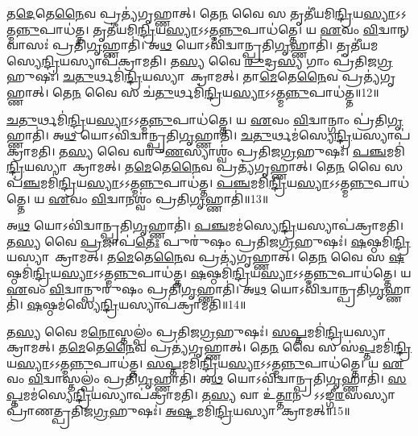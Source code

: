 𑌤\ul{𑌦𑍇}𑌤𑍇\ul{𑌨𑍈}𑌵 𑌪𑍍𑌰𑌤𑍍𑌯॑𑌗𑍃𑌹𑍍𑌣𑌾𑌤𑍍।
𑌤𑍇\ul{𑌨} 𑌵𑍈 𑌸 𑌤𑍃𑌤𑍀॑𑌯𑌮𑌿\ul{𑌨𑍍𑌦𑍍𑌰𑌿}𑌯\-\ul{𑌸𑍍𑌯𑌾}\-𑌽𑌽𑌤𑍍𑌮\ul{𑌨𑍍𑌨𑍁}𑌪𑌾\-𑌧॑𑌤𑍍𑌤।
𑌤𑍃𑌤𑍀॑𑌯𑌮𑌿\ul{𑌨𑍍𑌦𑍍𑌰𑌿}𑌯\-\ul{𑌸𑍍𑌯𑌾}\-𑌽𑌽𑌤𑍍𑌮\ul{𑌨𑍍𑌨𑍁}𑌪𑌾\-𑌧॑𑌤𑍍𑌤𑍇।
𑌯 \ul{𑌏}𑌵𑌂 \ul{𑌵𑌿}𑌦𑍍𑌵𑌾𑌨𑍍 𑌵𑌾𑌸𑌃॑ 𑌪𑍍𑌰𑌤𑌿\ul{𑌗𑍃}𑌹𑍍𑌣𑌾𑌤𑌿॑।
𑌅\ul{𑌥} 𑌯𑍋𑌽𑌵𑌿॑𑌦𑍍𑌵𑌾𑌨𑍍𑌪𑍍𑌰𑌤𑌿\-\ul{𑌗𑍃}𑌹𑍍𑌣𑌾𑌤𑌿॑।
𑌤𑍃𑌤𑍀॑𑌯𑌮𑌸𑍍𑌯𑍇\ul{𑌨𑍍𑌦𑍍𑌰𑌿}𑌯\-𑌸𑍍𑌯𑌾𑌪॑\-𑌕𑍍𑌰𑌾𑌮𑌤𑌿।
𑌤\ul{𑌸𑍍𑌯} 𑌵𑍈 \ul{𑌰𑍁}𑌦𑍍𑌰\ul{𑌸𑍍𑌯} 𑌗𑌾𑌂 𑌪𑍍𑌰॑𑌤𑌿𑌜\ul{𑌗𑍍𑌰}𑌹𑍁𑌷𑌃॑।
\ul{𑌚}\ul{𑌤𑍁}𑌰𑍍𑌥𑌮𑌿॑\ul{𑌨𑍍𑌦𑍍𑌰𑌿}𑌯\-𑌸𑍍𑌯𑌾𑌪𑌾᳚\-𑌕𑍍𑌰𑌾𑌮𑌤𑍍।
𑌤𑌾\ul{𑌮𑍇}𑌤𑍇\ul{𑌨𑍈}𑌵 𑌪𑍍𑌰𑌤𑍍𑌯॑𑌗𑍃𑌹𑍍𑌣𑌾𑌤𑍍।
𑌤𑍇\ul{𑌨} 𑌵𑍈 𑌸 𑌚॑\ul{𑌤𑍁}𑌰𑍍𑌥𑌮𑌿॑\ul{𑌨𑍍𑌦𑍍𑌰𑌿}𑌯\-\ul{𑌸𑍍𑌯𑌾}\-𑌽𑌽𑌤𑍍𑌮\ul{𑌨𑍍𑌨𑍁}𑌪𑌾\-𑌧॑𑌤𑍍𑌤॥12॥

\ul{𑌚}\ul{𑌤𑍁}𑌰𑍍𑌥𑌮𑌿॑\ul{𑌨𑍍𑌦𑍍𑌰𑌿}𑌯\-\ul{𑌸𑍍𑌯𑌾}\-𑌽𑌽𑌤𑍍𑌮\ul{𑌨𑍍𑌨𑍁}𑌪𑌾\-𑌧॑𑌤𑍍𑌤𑍇।
𑌯 \ul{𑌏}𑌵𑌂 \ul{𑌵𑌿}𑌦𑍍𑌵𑌾𑌨𑍍𑌗𑌾𑌂 𑌪𑍍𑌰॑𑌤𑌿\ul{𑌗𑍃}𑌹𑍍𑌣𑌾𑌤𑌿॑।
𑌅\ul{𑌥} 𑌯𑍋𑌽𑌵𑌿॑𑌦𑍍𑌵𑌾𑌨𑍍𑌪𑍍𑌰𑌤𑌿\ul{𑌗𑍃}𑌹𑍍𑌣𑌾𑌤𑌿॑।
\ul{𑌚}\ul{𑌤𑍁}𑌰𑍍𑌥𑌮॑𑌸𑍍𑌯𑍇\ul{𑌨𑍍𑌦𑍍𑌰𑌿}𑌯\-𑌸𑍍𑌯𑌾𑌪॑\-𑌕𑍍𑌰𑌾𑌮𑌤𑌿।
𑌤\ul{𑌸𑍍𑌯} 𑌵𑍈 𑌵𑌰𑍁॑\ul{𑌣}𑌸𑍍𑌯𑌾𑌶𑍍𑌵𑌂॑ 𑌪𑍍𑌰𑌤𑌿𑌜\ul{𑌗𑍍𑌰}𑌹𑍁𑌷𑌃॑।
\ul{𑌪}\ul{𑌞𑍍𑌚}𑌮𑌮𑌿॑\ul{𑌨𑍍𑌦𑍍𑌰𑌿}𑌯\-𑌸𑍍𑌯𑌾𑌪𑌾᳚\-𑌕𑍍𑌰𑌾𑌮𑌤𑍍।
𑌤\ul{𑌮𑍇}𑌤𑍇\ul{𑌨𑍈}𑌵 𑌪𑍍𑌰𑌤𑍍𑌯॑𑌗𑍃𑌹𑍍𑌣𑌾𑌤𑍍।
𑌤𑍇\ul{𑌨} 𑌵𑍈 𑌸 𑌪॑\ul{𑌞𑍍𑌚}𑌮𑌮𑌿॑\ul{𑌨𑍍𑌦𑍍𑌰𑌿}𑌯\-\ul{𑌸𑍍𑌯𑌾}\-𑌽𑌽𑌤𑍍𑌮\ul{𑌨𑍍𑌨𑍁}𑌪𑌾\-𑌧॑𑌤𑍍𑌤।
\ul{𑌪}\ul{𑌞𑍍𑌚}𑌮𑌮𑌿॑\ul{𑌨𑍍𑌦𑍍𑌰𑌿}𑌯\-\ul{𑌸𑍍𑌯𑌾}\-𑌽𑌽𑌤𑍍𑌮\ul{𑌨𑍍𑌨𑍁}𑌪𑌾\-𑌧॑𑌤𑍍𑌤𑍇।
𑌯 \ul{𑌏}𑌵𑌂 \ul{𑌵𑌿}𑌦𑍍𑌵𑌾𑌨𑌶𑍍𑌵𑌂॑ 𑌪𑍍𑌰𑌤𑌿\-\ul{𑌗𑍃}𑌹𑍍𑌣𑌾𑌤𑌿॑॥13॥

𑌅\ul{𑌥} 𑌯𑍋𑌽𑌵𑌿॑𑌦𑍍𑌵𑌾𑌨𑍍𑌪𑍍𑌰𑌤𑌿\ul{𑌗𑍃}𑌹𑍍𑌣𑌾𑌤𑌿॑।
\ul{𑌪}\ul{𑌞𑍍𑌚}𑌮𑌮॑𑌸𑍍𑌯𑍇\ul{𑌨𑍍𑌦𑍍𑌰𑌿}𑌯\-𑌸𑍍𑌯𑌾𑌪॑\-𑌕𑍍𑌰𑌾𑌮𑌤𑌿।
𑌤\ul{𑌸𑍍𑌯} 𑌵𑍈 \ul{𑌪𑍍𑌰}𑌜𑌾𑌪॑\ul{𑌤𑍇𑌃} 𑌪𑍁𑌰𑍁॑𑌷𑌂 𑌪𑍍𑌰𑌤𑌿\-𑌜\ul{𑌗𑍍𑌰}𑌹𑍁𑌷𑌃॑।
\ul{𑌷}𑌷𑍍𑌠𑌮𑌿॑\ul{𑌨𑍍𑌦𑍍𑌰𑌿}𑌯\-𑌸𑍍𑌯𑌾𑌪𑌾᳚𑌕𑍍𑌰𑌾𑌮𑌤𑍍।
𑌤\ul{𑌮𑍇}𑌤𑍇\ul{𑌨𑍈}𑌵 𑌪𑍍𑌰𑌤𑍍𑌯॑𑌗𑍃𑌹𑍍𑌣𑌾𑌤𑍍।
𑌤𑍇\ul{𑌨} 𑌵𑍈 𑌸 \ul{𑌷}𑌷𑍍𑌠𑌮𑌿॑\ul{𑌨𑍍𑌦𑍍𑌰𑌿}𑌯\-\ul{𑌸𑍍𑌯𑌾}\-𑌽𑌽𑌤𑍍𑌮\ul{𑌨𑍍𑌨𑍁}𑌪𑌾\-𑌧॑𑌤𑍍𑌤।
\ul{𑌷}𑌷𑍍𑌠𑌮𑌿॑\ul{𑌨𑍍𑌦𑍍𑌰𑌿}𑌯\-\ul{𑌸𑍍𑌯𑌾}\-𑌽𑌽𑌤𑍍𑌮\ul{𑌨𑍍𑌨𑍁}𑌪𑌾\-𑌧॑𑌤𑍍𑌤𑍇।
𑌯 \ul{𑌏}𑌵𑌂 \ul{𑌵𑌿}𑌦𑍍𑌵𑌾𑌨𑍍𑌪𑍁𑌰𑍁॑𑌷𑌂 𑌪𑍍𑌰𑌤𑌿\-\ul{𑌗𑍃}𑌹𑍍𑌣𑌾𑌤𑌿॑।
𑌅\ul{𑌥} 𑌯𑍋𑌽𑌵𑌿॑𑌦𑍍𑌵𑌾𑌨𑍍𑌪𑍍𑌰𑌤𑌿\-\ul{𑌗𑍃}𑌹𑍍𑌣𑌾𑌤𑌿॑।
\ul{𑌷}𑌷𑍍𑌠𑌮॑𑌸𑍍𑌯𑍇\ul{𑌨𑍍𑌦𑍍𑌰𑌿}𑌯\-𑌸𑍍𑌯𑌾𑌪॑\-𑌕𑍍𑌰𑌾𑌮𑌤𑌿॥14॥

𑌤\ul{𑌸𑍍𑌯} 𑌵𑍈 𑌮\ul{𑌨𑍋}𑌸𑍍𑌤𑌲𑍍𑌪𑌂॑ 𑌪𑍍𑌰𑌤𑌿\-𑌜\ul{𑌗𑍍𑌰}𑌹𑍁𑌷𑌃॑।
\ul{𑌸}\ul{𑌪𑍍𑌤}𑌮𑌮𑌿॑\ul{𑌨𑍍𑌦𑍍𑌰𑌿}𑌯\-𑌸𑍍𑌯𑌾𑌪𑌾᳚\-𑌕𑍍𑌰𑌾𑌮𑌤𑍍।
𑌤\ul{𑌮𑍇}𑌤𑍇\ul{𑌨𑍈}𑌵 𑌪𑍍𑌰𑌤𑍍𑌯॑\-𑌗𑍃𑌹𑍍𑌣𑌾𑌤𑍍।
𑌤𑍇\ul{𑌨} 𑌵𑍈 𑌸 𑌸॑\ul{𑌪𑍍𑌤}𑌮𑌮𑌿॑\ul{𑌨𑍍𑌦𑍍𑌰𑌿}𑌯\-\ul{𑌸𑍍𑌯𑌾}\-𑌽𑌽𑌤𑍍𑌮\ul{𑌨𑍍𑌨𑍁}𑌪𑌾\-𑌧॑𑌤𑍍𑌤।
\ul{𑌸}\ul{𑌪𑍍𑌤}𑌮𑌮𑌿॑\ul{𑌨𑍍𑌦𑍍𑌰𑌿}𑌯\-\ul{𑌸𑍍𑌯𑌾}\-𑌽𑌽𑌤𑍍𑌮\ul{𑌨𑍍𑌨𑍁}𑌪𑌾\-𑌧॑𑌤𑍍𑌤𑍇।
𑌯 \ul{𑌏}𑌵𑌂 \ul{𑌵𑌿}𑌦𑍍𑌵𑌾𑌸𑍍𑌤𑌲𑍍𑌪𑌂॑ 𑌪𑍍𑌰𑌤𑌿\-\ul{𑌗𑍃}𑌹𑍍𑌣𑌾𑌤𑌿॑।
𑌅\ul{𑌥} 𑌯𑍋\-𑌽𑌵𑌿॑𑌦𑍍𑌵𑌾𑌨𑍍𑌪𑍍𑌰𑌤𑌿\-\ul{𑌗𑍃}𑌹𑍍𑌣𑌾𑌤𑌿॑।
\ul{𑌸}\ul{𑌪𑍍𑌤}𑌮𑌮॑𑌸𑍍𑌯𑍇\ul{𑌨𑍍𑌦𑍍𑌰𑌿}𑌯\-𑌸𑍍𑌯𑌾𑌪॑\-𑌕𑍍𑌰𑌾𑌮𑌤𑌿।
𑌤\ul{𑌸𑍍𑌯} 𑌵𑌾 𑌉॑\ul{𑌤𑍍𑌤𑌾}𑌨𑌸𑍍𑌯𑌾᳚\-𑌽𑌽𑌙𑍍𑌗𑍀\ul{𑌰}𑌸𑌸𑍍𑌯𑌾𑌪𑍍𑌰𑌾॑𑌣𑌤𑍍𑌪𑍍𑌰𑌤𑌿\-𑌜\ul{𑌗𑍍𑌰}𑌹𑍁𑌷𑌃॑।
\ul{𑌅}\ul{𑌷𑍍𑌟}𑌮𑌮𑌿॑\ul{𑌨𑍍𑌦𑍍𑌰𑌿}𑌯\-𑌸𑍍𑌯𑌾𑌪𑌾᳚𑌕𑍍𑌰𑌾𑌮𑌤𑍍॥15॥

